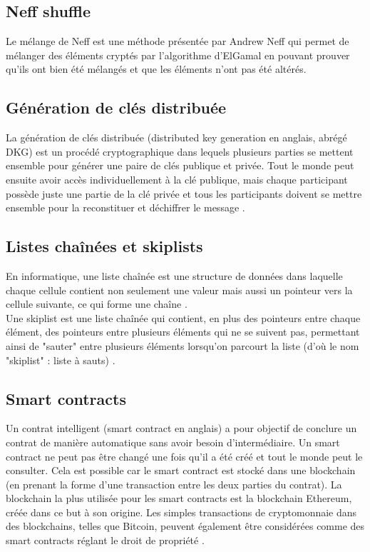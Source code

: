 \documentclass[10pt,a4paper,twoside]{article}
\numberwithin{equation}{section}
\begin{document}
		
	\subsection{Neff shuffle} \label{shuffle}
		Le mélange de Neff est une méthode présentée par Andrew Neff \cite{neff_shuffle} qui permet de mélanger des éléments cryptés par l'algorithme d'ElGamal en pouvant prouver qu'ils ont bien été mélangés et que les éléments n'ont pas été altérés.
		
	\subsection{Génération de clés distribuée} \label{DKG}
		La génération de clés distribuée (distributed key generation en anglais, abrégé DKG) est un procédé cryptographique dans lequels plusieurs parties se mettent ensemble pour générer une paire de clés publique et privée. Tout le monde peut ensuite avoir accès individuellement à la clé publique, mais chaque participant possède juste une partie de la clé privée et tous les participants doivent se mettre ensemble pour la reconstituer et déchiffrer le message \cite{wiki:DKG}.
	
	\subsection{Listes chaînées et skiplists} \label{skiplist}
		En informatique, une liste chaînée est une structure de données dans laquelle chaque cellule contient non seulement une valeur mais aussi un pointeur vers la cellule suivante, ce qui forme une chaîne \cite{wiki:linked_list}.\\
		Une skiplist est une liste chaînée qui contient, en plus des pointeurs entre chaque élément, des pointeurs entre plusieurs éléments qui ne se suivent pas, permettant ainsi de "sauter" entre plusieurs éléments lorsqu'on parcourt la liste (d'où le nom "skiplist" : liste à sauts) \cite{wiki:skiplist}.

		
	\subsection{Smart contracts} \label{smart_contracts}
		Un contrat intelligent (smart contract en anglais) a pour objectif de conclure un contrat de manière automatique sans avoir besoin d'intermédiaire. Un smart contract ne peut pas être changé une fois qu'il a été créé et tout le monde peut le consulter. Cela est possible car le smart contract est stocké dans une blockchain (en prenant la forme d'une transaction entre les deux parties du contrat). La blockchain la plus utilisée pour les smart contracts est la blockchain Ethereum, créée dans ce but à son origine. Les simples transactions de cryptomonnaie dans des blockchains, telles que Bitcoin, peuvent également être considérées comme des smart contracts réglant le droit de propriété \cite{wiki:smart_contracts}.
	
\end{document}
